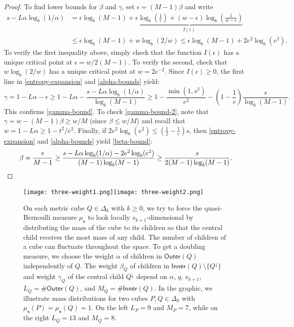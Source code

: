 \documentclass[12pt]{amsart}
\theoremstyle{definition}
\theoremstyle{remark}
\newcommand{\muse}{\mu_{\mathbf{s}}}
\newcommand{\Outer}{\mathsf{Outer}}
\newcommand{\Inner}{\mathsf{Inner}}
\numberwithin{figure}{section}
\numberwithin{equation}{section}
\begin{document}
\begin{proof}
To find lower bounds for $\beta$ and $\gamma$, set $\epsilon=(M-1)\beta$ and write \begin{equation}\begin{split}\label{entropy-expansion}
s-L\alpha\log_b(1/\alpha)&=\epsilon\log_b(M-1)
   +\underbrace{\epsilon\log_b\left(\frac{1}{\epsilon}\right)+(w-\epsilon)\log_b\left(\frac{1}{w-\epsilon}\right)}_{I(\epsilon)}\\
&\leq \epsilon\log_b(M-1)+w\log_b(2/w)\leq \epsilon\log_b(M-1)+2e^2\log_b(e^2).\end{split}\end{equation} To verify the first inequality above, simply check that the function $I(\epsilon)$ has a unique critical point at $\epsilon=w/2(M-1)$. To verify the second, check that $w\log_b(2/w)$ has a unique critical point at $w=2e^{-2}$. Since $I(\epsilon)\geq 0$, the first line in \eqref{entropy-expansion} and \eqref{alpha-bounds} yield: $$\gamma=1-L\alpha-\epsilon \geq 1-L\alpha-\frac{s-L\alpha\log_b(1/\alpha)}{\log_b(M-1)}\geq 1-\frac{\min(1,s^2)}{e^2}-\left(1-\frac{1}{e}\right)\frac{s}{\log_b(M-1)}.$$ This confirms \eqref{gamma-bound}. To check \eqref{gamma-bound-2}, note that $\gamma=w-(M-1)\beta\geq w/M$ (since $\beta\leq w/M$) and recall that $w=1-L\alpha\geq 1-t^2/e^2$. Finally, if $2e^2\log_b(e^2)\leq(\frac{1}{2}-\frac{1}{e})s$, then \eqref{entropy-expansion} and \eqref{alpha-bounds} yield \eqref{beta-bound}: \begin{equation*}\beta=\frac{\epsilon}{M-1}
\geq \frac{s-L\alpha\log_b(1/\alpha)-2e^2\log_b(e^2)}{(M-1)\log_b(M-1)}\geq \frac{s}{2(M-1)\log_b(M-1)}.\qedhere\end{equation*}
\end{proof}

\begin{figure}\texttt{[image: three-weight1.png]}\hspace{.08\textwidth}\texttt{[image: three-weight2.png]}
\caption{On each metric cube $Q\in\Delta_k$ with $k\geq 0$, we try to force the quasi-Bernoulli measure $\muse$ to look locally $s_{k+1}$-dimensional by distributing the mass of the cube to its children so that the central child receives the most mass of any child. The number of children of a cube can fluctuate throughout the space. To get a doubling measure, we choose the weight $\alpha$ of children in $\Outer(Q)$ independently of $Q$. The weight $\beta_Q$ of children in $\Inner(Q)\setminus\{Q^\downarrow\}$ and weight $\gamma_Q$ of the central child $Q^\downarrow$ depend on $\alpha$, $q$, $s_{k+1}$, $L_Q=\#\Outer(Q)$, and $M_Q=\#\Inner(Q)$. In the graphic, we illustrate mass distributions for two cubes $P,Q\in\Delta_k$ with $\muse(P)=\muse(Q)=1$. On the left $L_P=9$ and $M_P=7$, while on the right $L_Q=13$ and $M_Q=8$.}\label{fig:qb} \end{figure}
\end{document}
